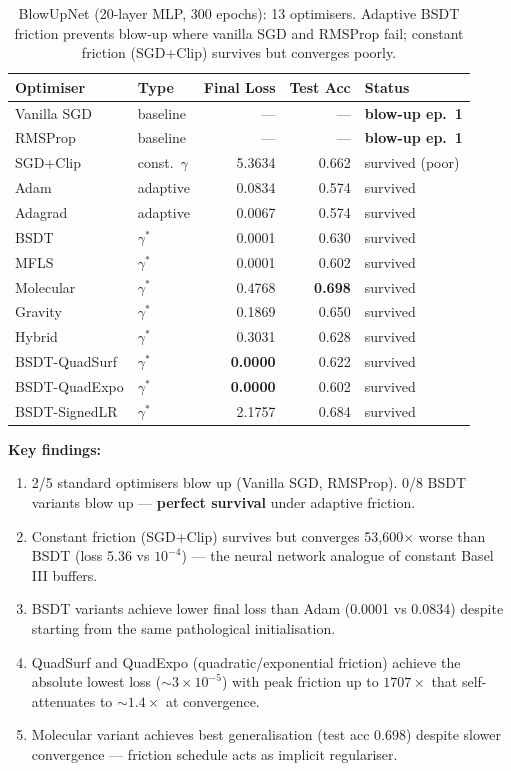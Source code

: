\documentclass[11pt,a4paper]{article}
\begin{document}
\begin{table}[H]
\centering
\caption{BlowUpNet (20-layer MLP, 300 epochs): 13 optimisers.  Adaptive BSDT
friction prevents blow-up where vanilla SGD and RMSProp fail; constant friction
(SGD+Clip) survives but converges poorly.}
\label{tab:nn-results}
\small
\begin{tabular}{@{}llrrl@{}}
\toprule
\textbf{Optimiser} & \textbf{Type} & \textbf{Final Loss} & \textbf{Test Acc} & \textbf{Status} \\
\midrule
Vanilla SGD       & baseline   &     ---    &   ---   & \textbf{blow-up ep.\ 1} \\
RMSProp           & baseline   &     ---    &   ---   & \textbf{blow-up ep.\ 1} \\
\midrule
SGD+Clip          & const.\ $\gamma$ & 5.3634 & 0.662 & survived (poor) \\
Adam              & adaptive   & 0.0834 & 0.574 & survived \\
Adagrad           & adaptive   & 0.0067 & 0.574 & survived \\
\midrule
BSDT              & $\gamma^*$ & 0.0001 & 0.630 & survived \\
MFLS              & $\gamma^*$ & 0.0001 & 0.602 & survived \\
Molecular         & $\gamma^*$ & 0.4768 & \textbf{0.698} & survived \\
Gravity           & $\gamma^*$ & 0.1869 & 0.650 & survived \\
Hybrid            & $\gamma^*$ & 0.3031 & 0.628 & survived \\
BSDT-QuadSurf     & $\gamma^*$ & \textbf{0.0000} & 0.622 & survived \\
BSDT-QuadExpo     & $\gamma^*$ & \textbf{0.0000} & 0.602 & survived \\
BSDT-SignedLR     & $\gamma^*$ & 2.1757 & 0.684 & survived \\
\bottomrule
\end{tabular}
\end{table}

\textbf{Key findings:}
\begin{enumerate}[nosep]
  \item 2/5 standard optimisers blow up (Vanilla SGD, RMSProp). 0/8 BSDT
        variants blow up --- \textbf{perfect survival} under adaptive friction.
  \item Constant friction (SGD+Clip) survives but converges 53{,}600$\times$
        worse than BSDT (loss 5.36 vs $10^{-4}$) --- the neural network
        analogue of constant Basel III buffers.
  \item BSDT variants achieve lower final loss than Adam (0.0001 vs 0.0834)
        despite starting from the same pathological initialisation.
  \item QuadSurf and QuadExpo (quadratic/exponential friction) achieve the
        absolute lowest loss ($\sim 3 \times 10^{-5}$) with peak friction up
        to $1707\times$ that self-attenuates to $\sim 1.4\times$ at convergence.
  \item Molecular variant achieves best generalisation (test acc 0.698) despite
        slower convergence --- friction schedule acts as implicit regulariser.
\end{enumerate}
\end{document}
